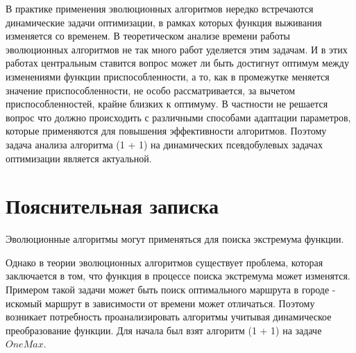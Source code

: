 \documentclass[times,specification,annotation]{itmo-student-thesis}
\begin{document}




    \tableofcontents


    \startprefacepage

    В практике применения эволюционных алгоритмов нередко встречаются динамические задачи оптимизации, в рамках которых функция выживания изменяется со временем.
    В теоретическом анализе времени работы эволюционных алгоритмов не так много работ уделяется этим задачам.
    И в этих работах центральным ставится вопрос может ли быть достигнут оптимум между изменениями функции приспособленности, а то, как в промежутке меняется значение приспособленности, не особо рассматривается, за вычетом приспособленностей, крайне близких к оптимуму.
    В частности не решается вопрос что должно происходить с различными способами адаптации параметров, которые применяются для повышения эффективности алгоритмов. Поэтому задача анализа алгоритма (1 + 1) на динамических псевдобулевых задачах оптимизации является актуальной.


    \chapter{Пояснительная записка}

    Эволюционные алгоритмы могут применяться для поиска экстремума функции.

    Однако в теории эволюционных алгоритмов существует проблема, которая заключается в том, что функция в процессе поиска экстремума может изменятся.
    Примером такой задачи может быть поиск оптимального маршрута в городе - искомый маршрут в зависимости от времени может отличаться.
    Поэтому возникает потребность проанализировать алгоритмы учитывая динамическое преобразование функции.
    Для начала был взят алгоритм (1 + 1) на задаче $OneMax$.
\end{document}
